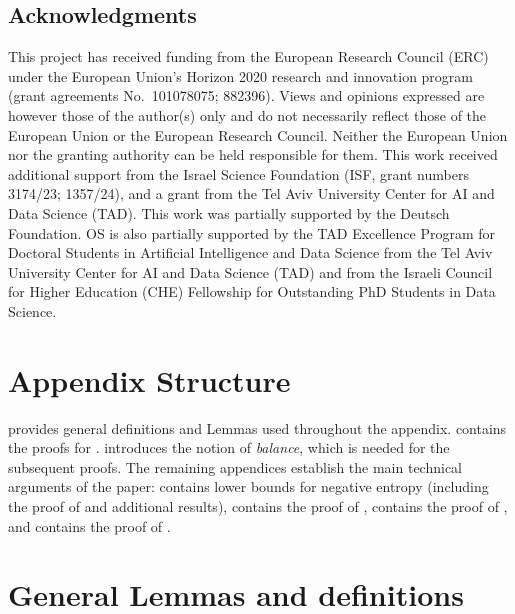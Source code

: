 \documentclass[10pt]{article}
\newif\ifopt
\newcommand{\notopt}[1]{\ifopt\else #1\fi}
\theoremstyle{definition}
\theoremstyle{remark}
\begin{document}
\subsection*{Acknowledgments}
This project has received funding from the European Research Council (ERC) under the European Union’s Horizon 2020 research and innovation program (grant agreements No.\ 101078075; 882396). Views and opinions expressed are however those of the author(s) only and do not necessarily reflect those of the European Union or the European Research Council. Neither the European Union nor the granting authority can be held responsible for them. This work received additional support from the Israel Science Foundation (ISF, grant numbers 3174/23; 1357/24), and a grant from the Tel Aviv University Center for AI and Data Science (TAD). This work was partially supported by the Deutsch Foundation. OS is also partially
supported by the TAD Excellence Program for Doctoral Students in Artificial Intelligence and Data
Science from the Tel Aviv University Center for AI and Data Science (TAD) and from the Israeli
Council for Higher Education (CHE) Fellowship for Outstanding PhD Students in Data Science.

\newpage

\notopt{}

\newpage
\appendix

\section*{Appendix Structure}
 provides general definitions and Lemmas used throughout the appendix. 
 contains the proofs for . 
 introduces the notion of \emph{balance}, which is needed for the subsequent proofs. 
The remaining appendices establish the main technical arguments of the paper: 
 contains lower bounds for negative entropy (including the proof of  and additional results), 
 contains the proof of , 
 contains the proof of , 
and  contains the proof of .

\section{General Lemmas and definitions}\label{sec:general}
\end{document}
